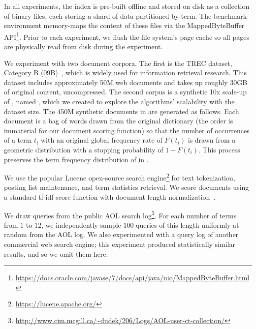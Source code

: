 In all experiments, the index is pre-built offline and stored on disk as a collection of binary files, 
each storing a shard of data partitioned by term.  The benchmark environment memory-maps the content 
of these files via the MappedByteBuffer API\footnote{\small{\url{https://docs.oracle.com/javase/7/docs/api/java/nio/MappedByteBuffer.html}}}.
Prior to each experiment, we flush the file system's page cache so all pages are physically read from disk during the experiment.

We  experiment with two document corpora. The first  is the TREC {\cw\/} dataset, 
Category B ({\cw}09B)~\cite{ClueWeb09}, which is widely used for information retrieval research. This dataset includes approximately 50M web documents and takes up roughly 30GB of original content, uncompressed.
The second corpus is a synthetic 10x scale-up of \cw, named \cwten, which we created to explore the algorithms' scalability 
with the dataset size. 
The 450M synthetic documents in {\cwten\/} are generated as follows. Each document is a bag of words drawn from the original {\cw\/} dictionary 
(the order is immaterial for our document scoring function) 
so that the number of occurrences of a term $t_i$ with an original 
global frequency rate of $F(t_i)$ is drawn from a geometric distribution with a stopping probability of $1-F(t_i)$. This  process preserves 
the  term frequency distribution of {\cw\/} in \cwten.
 
We use the popular Lucene open-source search engine\footnote{\small{\url{https://lucene.apache.org/}}} for text tokenization, posting list maintenance, 
and term statistics retrieval.
We score documents using 
a standard tf-idf score function with document length normalization~\cite{Baeza-Yates:1999:MIR:553876}. 

We draw queries from the public AOL search log\footnote{\small{\url{http://www.cim.mcgill.ca/~dudek/206/Logs/AOL-user-ct-collection/}}}.
For each number of terms from $1$ to $12$, we independently sample $100$ queries of this length uniformly at random from the AOL log.
We also  experimented with a query log of another commercial web search engine; this experiment  
produced statistically similar results, and so we omit them here.  

